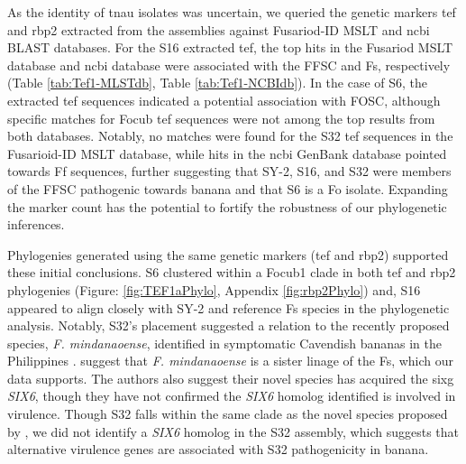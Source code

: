 As the identity of \ac{tnau} isolates was uncertain, we queried the genetic markers \acf{tef} and \acf{rbp2} extracted from the assemblies against Fusariod-ID MSLT and \ac{ncbi} BLAST databases. For the S16 extracted \ac{tef}, the top hits in the Fusariod MSLT database and \ac{ncbi} database were associated with the \ac{FFSC} and \ac{Fs}, respectively (Table \ref{tab:Tef1-MLSTdb}, Table \ref{tab:Tef1-NCBIdb}). In the case of S6, the extracted \ac{tef} sequences indicated a potential association with \ac{FOSC}, although specific matches for \ac{Focub} \ac{tef} sequences were not among the top results from both databases. Notably, no matches were found for the S32 \ac{tef} sequences in the Fusarioid-ID MSLT database, while hits in the \ac{ncbi} GenBank database pointed towards \ac{Ff} sequences, further suggesting that SY-2, S16, and S32 were members of the \ac{FFSC} pathogenic towards banana and that S6 is a \ac{Fo} isolate. Expanding the marker count has the potential to fortify the robustness of our phylogenetic inferences. 

Phylogenies generated using the same genetic markers (\ac{tef} and \ac{rbp2}) supported these initial conclusions. S6 clustered within a \ac{Focub1} clade in both \acs{tef} and \ac{rbp2} phylogenies (Figure: \ref{fig:TEF1aPhylo}, Appendix \ref{fig:rbp2Phylo}) and, S16 appeared to align closely with SY-2 and reference \ac{Fs} species in the phylogenetic analysis. Notably, S32's placement suggested a relation to the recently proposed species, \textit{F. mindanaoense}, identified in symptomatic Cavendish bananas in the Philippines \parencite{Nozawa2023}. \textcite{Nozawa2023} suggest that \textit{F. mindanaoense} is a sister linage of the \ac{Fs}, which our data supports. The authors also suggest their novel species has acquired the \ac{sixg} \textit{SIX6}, though they have not confirmed the \textit{SIX6} homolog identified is involved in virulence. Though S32 falls within the same clade as the novel species proposed by \textcite{Nozawa2023}, we did not identify a \textit{SIX6} homolog in the S32 assembly, which suggests that alternative virulence genes are associated with S32 pathogenicity in banana. 

